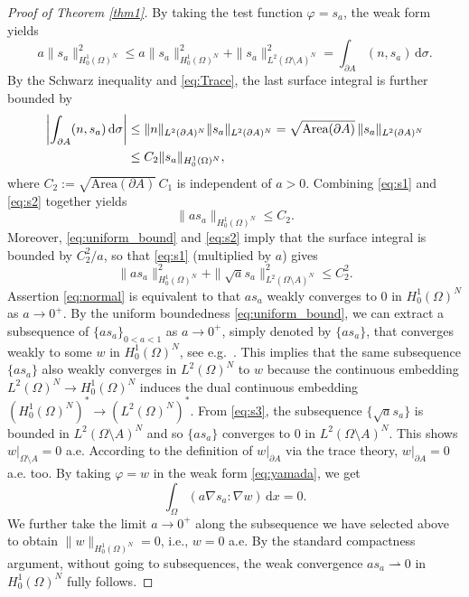 \documentclass[graybox]{svmult}
\renewcommand{\d}{\mathrm{d}}  %
\renewcommand{\AA}{A}  %
\begin{document}
\begin{proof}[Proof of Theorem \ref{thm1}] By taking the test function $\varphi = s_a$, the weak form yields 
\begin{equation}\label{eq:s1}
a \|s_a \|_{H_0^1(\Omega)^N}^2 \le a \|s_a \|_{H_0^1(\Omega)^N}^2 +  \|s_a \|_{L^2(\Omega\setminus\AA)^N}^2 = \int_{\partial \AA} (n, s_a)\, \d \sigma. 
\end{equation}
By the Schwarz inequality and \eqref{eq:Trace}, the last surface integral is further bounded by 
\begin{align}
\left|\int_{\partial \AA} (n, s_a)\, \d \sigma  \right|   \label{eq:s2}
&\le \|n\|_{L^2(\partial \AA)^N} \|s_a\|_{L^2 (\partial \AA)^N} = \sqrt{\text{Area}(\partial \AA)}\,\|s_a\|_{L^2 (\partial \AA)^N} \\
&\le C_2 \|s_a\|_{H_0^1(\Omega)^N}, \notag 
\end{align}
where $C_2 :=\sqrt{\text{Area}(\partial \AA)} \, C_1$ is independent of $a>0$.  Combining \eqref{eq:s1} and \eqref{eq:s2} together yields  
\begin{equation} \label{eq:uniform_bound}
 \|a s_a \|_{H_0^1(\Omega)^N} \le C_2.   
\end{equation}
Moreover,  \eqref{eq:uniform_bound} and \eqref{eq:s2} imply that the surface integral is bounded by $C_2^2 /a$, so that \eqref{eq:s1} (multiplied by $a$) gives
\begin{equation} \label{eq:s3}
 \| a s_a \|_{H_0^1(\Omega)^N}^2 +  \|\sqrt{a} s_a \|_{L^2(\Omega\setminus\AA)^N}^2 \le C_2^2. 
\end{equation}
 Assertion \eqref{eq:normal} is equivalent to that $as_a$ weakly converges to $0$ in $H_0^1(\Omega)^N$ as $a\to0^+$.  By the uniform boundedness \eqref{eq:uniform_bound}, we can extract a subsequence of $\{a s_a\}_{0<a<1}$ as $a\to0^+$,   simply denoted by $\{a s_a\}$, that converges weakly to some $w$ in $H_0^1(\Omega)^N$, see e.g.\ \cite[Theorem 3.18]{B11}. This implies that the same subsequence $\{a s_a\}$ also weakly converges in $L^2(\Omega)^N$ to $w$ because the continuous embedding $L^2(\Omega)^N \to H_0^1(\Omega)^N$ induces the dual continuous embedding $(H_0^1(\Omega)^N)^* \to (L^2(\Omega)^N)^*$.  From \eqref{eq:s3}, the subsequence $\{\sqrt{a} s_a\}$ is bounded in $L^2(\Omega \setminus \AA)^N$ and so $\{a s_a\}$ converges to 0 in $L^2(\Omega \setminus \AA)^N$. This shows $w|_{\Omega\setminus \AA} =0$ a.e. According to the definition of $w|_{\partial \AA}$ via the trace theory, $w|_{\partial \AA}=0$ a.e. too. By taking $\varphi=w$ in the weak form \eqref{eq:yamada}, we get 
\[
\int_\Omega (a \nabla s_a: \nabla w)\, \d x = 0. 
\]
We further take the limit $a\to0^+$ along the subsequence we have selected above to obtain $\|w\|_{H_0^1(\Omega)^N}=0$, i.e., $w=0$ a.e. By the standard  compactness argument, without going to subsequences, the weak convergence $as_a \rightharpoonup 0$ in $H_0^1(\Omega)^N$ fully follows. 


\end{proof}
\end{document}

